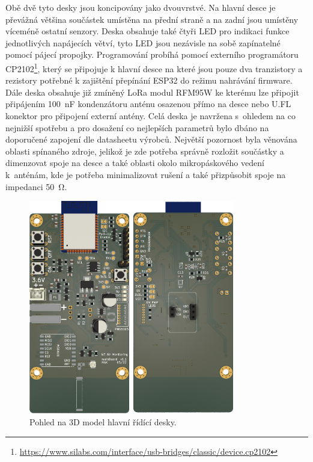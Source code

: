 Obě dvě tyto desky jsou koncipovány jako dvouvrstvé. Na hlavní desce je převážná většina součástek umístěna na přední straně a na zadní jsou umístěny víceméně ostatní senzory. Deska obsahuje také čtyři LED pro indikaci funkce jednotlivých napájecích větví, tyto LED jsou nezávisle na sobě zapínatelné pomocí pájecí propojky. Programování probíhá pomocí externího programátoru CP2102\footnote{\url{https://www.silabs.com/interface/usb-bridges/classic/device.cp2102}}, který se připojuje k hlavní desce na které jsou pouze dva tranzistory a rezistory potřebné k zajištění přepínání ESP32 do režimu nahrávání firmware. Dále deska obsahuje již zmíněný LoRa modul RFM95W ke kterému lze připojit připájením \SI{100}{\nano\farad} kondenzátoru anténu osazenou přímo na desce nebo U.FL konektor pro připojení externí antény. Celá deska je navržena s~ohledem na co nejnižší spotřebu a pro dosažení co nejlepších parametrů bylo dbáno na doporučené zapojení dle datasheetu výrobců. Největší pozornost byla věnována oblasti spínaného zdroje, jelikož je zde potřeba správně rozložit součástky a dimenzovat spoje na desce a také oblasti okolo mikropáskového vedení k~anténám, kde je potřeba minimalizovat rušení a také přizpůsobit spoje na impedanci \SI{50}{\ohm}.

\begin{figure}
    \centering
    \includegraphics[width=0.8\textwidth]{obrazky/mainBoard-kicad.png}
    \caption{Pohled na 3D model hlavní řídící desky.}
    \label{fig_mainBoardKicadRender}
\end{figure}


